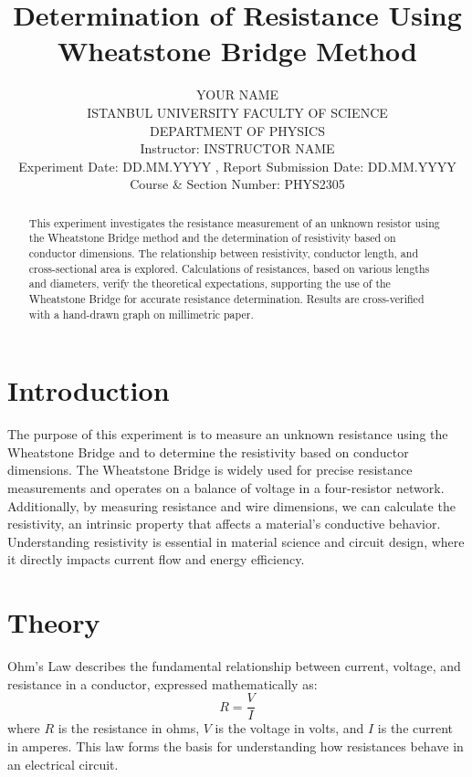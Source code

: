 \documentclass[journal]{IEEEtran}
\begin{document}
\title{Determination of Resistance Using Wheatstone Bridge Method}
\author{YOUR NAME\\
ISTANBUL UNIVERSITY FACULTY OF SCIENCE\\
DEPARTMENT OF PHYSICS\\
Instructor: INSTRUCTOR NAME\\
Experiment Date: DD.MM.YYYY , Report Submission Date: DD.MM.YYYY\\
Course \& Section Number: PHYS2305}

\maketitle

\begin{abstract}
    This experiment investigates the resistance measurement of an unknown resistor using the Wheatstone Bridge method and the determination of resistivity based on conductor dimensions. The relationship between resistivity, conductor length, and cross-sectional area is explored. Calculations of resistances, based on various lengths and diameters, verify the theoretical expectations, supporting the use of the Wheatstone Bridge for accurate resistance determination. Results are cross-verified with a hand-drawn graph on millimetric paper.
\end{abstract}
    

\section{Introduction}
The purpose of this experiment is to measure an unknown resistance using the Wheatstone Bridge and to determine the resistivity based on conductor dimensions. The Wheatstone Bridge is widely used for precise resistance measurements and operates on a balance of voltage in a four-resistor network. Additionally, by measuring resistance and wire dimensions, we can calculate the resistivity, an intrinsic property that affects a material's conductive behavior. Understanding resistivity is essential in material science and circuit design, where it directly impacts current flow and energy efficiency.
\section{Theory}
Ohm’s Law describes the fundamental relationship between current, voltage, and resistance in a conductor, expressed mathematically as:
\begin{equation}
    R = \frac{V}{I}
    \label{eq:ohmslaw}
\end{equation}
where \( R \) is the resistance in ohms, \( V \) is the voltage in volts, and \( I \) is the current in amperes. This law forms the basis for understanding how resistances behave in an electrical circuit.
\end{document}
